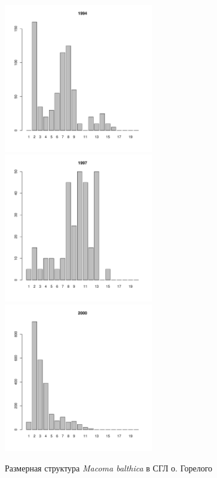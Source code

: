 \documentclass[12pt, a4paper]{article}
\begin{document}
\begin{figure}[h]
\begin{multicols}{3}
\hfill
\includegraphics[width=65mm]{../White_Sea/Luvenga_Goreliy/middle_1994_.pdf}
\hfill
\includegraphics[width=65mm]{../White_Sea/Luvenga_Goreliy/middle_1997_.pdf}
\hfill
\includegraphics[width=65mm]{../White_Sea/Luvenga_Goreliy/middle_2000_.pdf}
\end{multicols}



\caption{Размерная структура {\it Macoma balthica} в СГЛ о. Горелого}
\label{ris:size_str_Goreliy_mid}
\end{figure}
\end{document}
